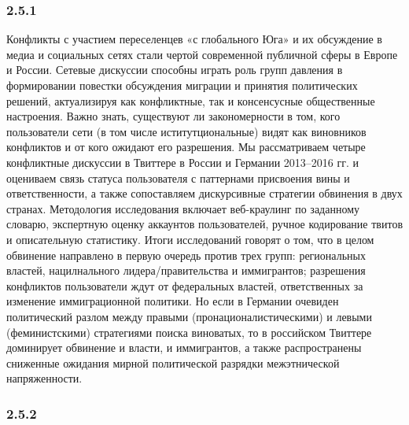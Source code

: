 \subsubsection{2.5.1}

Конфликты с участием переселенцев «с глобального Юга» и их обсуждение в медиа и социальных сетях стали чертой современной публичной сферы в Европе и России. Сетевые дискуссии способны играть роль групп давления в формировании повестки обсуждения миграции и принятия политических решений, актуализируя как конфликтные, так и консенсусные общественные настроения. Важно знать, существуют ли закономерности в том, кого пользователи сети (в том числе иститутциональные) видят как виновников конфликтов и от кого ожидают его разрешения. Мы рассматриваем четыре конфликтные дискуссии в Твиттере в России и Германии 2013--2016 гг. и оцениваем связь статуса пользователя с паттернами присвоения вины и ответственности, а также сопоставляем дискурсивные стратегии обвинения в двух странах. Методология исследования включает веб-краулинг по заданному словарю, экспертную оценку аккаунтов пользователей, ручное кодирование твитов и описательную статистику. Итоги исследований говорят о том, что в целом обвинение направлено в первую очередь против трех групп: региональных властей, нацилнального лидера/правительства и иммигрантов; разрешения конфликтов пользователи ждут от федеральных властей, ответственных за изменение иммиграционной политики. Но если в Германии очевиден политический разлом между правыми (пронационалистическими) и левыми (феминистскими) стратегиями поиска виноватых, то в российском Твиттере доминирует обвинение и власти, и иммигрантов, а также распространены сниженные ожидания мирной политической разрядки межэтнической напряженности.

\subsubsection{2.5.2}

